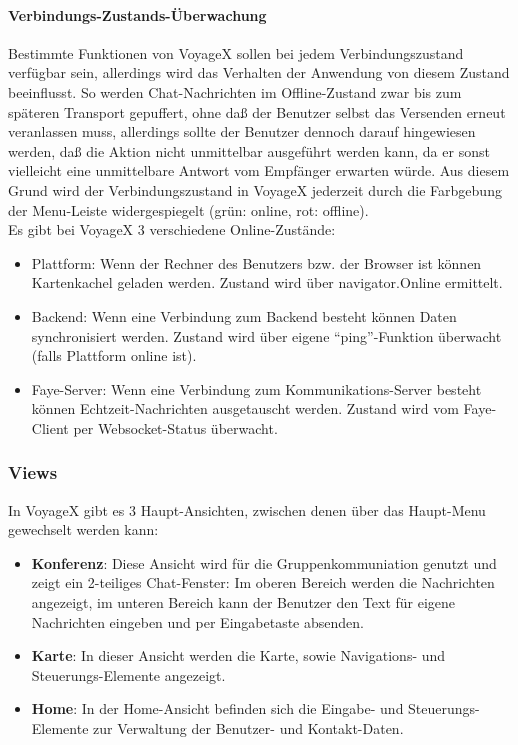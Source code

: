 \paragraph{Verbindungs-Zustands-Überwachung}
Bestimmte Funktionen von VoyageX sollen bei jedem Verbindungszustand verfügbar sein, allerdings
wird das Verhalten der Anwendung von diesem Zustand beeinflusst. So werden Chat-Nachrichten im Offline-Zustand zwar bis zum
späteren Transport gepuffert, ohne daß der Benutzer selbst das Versenden erneut veranlassen muss, allerdings sollte der Benutzer dennoch darauf hingewiesen werden, daß die Aktion nicht unmittelbar ausgeführt werden kann, da er sonst vielleicht eine unmittelbare Antwort vom Empfänger erwarten würde. Aus diesem Grund wird der Verbindungszustand in VoyageX jederzeit durch die Farbgebung der Menu-Leiste widergespiegelt (grün: online, rot: offline).\\%
Es gibt bei VoyageX 3 verschiedene Online-Zustände:
	\begin{itemize}
		\item Plattform: Wenn der Rechner des Benutzers bzw. der Browser ist können Kartenkachel geladen werden. Zustand wird über navigator.Online ermittelt.
		\item Backend: Wenn eine Verbindung zum Backend besteht können Daten synchronisiert werden. Zustand wird über eigene "`ping"'-Funktion  überwacht (falls Plattform online ist).
		\item Faye-Server: Wenn eine Verbindung zum Kommunikations-Server besteht können Echtzeit-Nachrichten ausgetauscht werden. Zustand wird vom Faye-Client per Websocket-Status überwacht.
	\end{itemize}


\subsubsection{Views}
In VoyageX gibt es 3 Haupt-Ansichten, zwischen denen über das Haupt-Menu gewechselt werden kann:
\begin{itemize}[leftmargin=*,noitemsep,topsep=1ex,parsep=0pt,partopsep=0pt]
\item \textbf{Konferenz}: Diese Ansicht wird für die Gruppenkommuniation genutzt und zeigt ein 2-teiliges Chat-Fenster: Im oberen Bereich werden die Nachrichten angezeigt, im unteren Bereich kann der Benutzer den Text für eigene Nachrichten eingeben und per Eingabetaste absenden. 
\item \textbf{Karte}: In dieser Ansicht werden die Karte, sowie Navigations- und Steuerungs-Elemente angezeigt.
\item \textbf{Home}: In der Home-Ansicht befinden sich die Eingabe- und Steuerungs-Elemente zur Verwaltung der Benutzer- und Kontakt-Daten.
\end{itemize}
	
